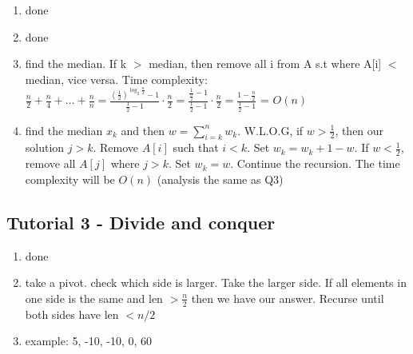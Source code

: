 \documentclass[../../main/main.tex]{subfiles}
\begin{document}
\begin{enumerate}
	\item done
	\item done
	\item
	      find the median. If k $>$ median, then remove all i from A s.t where A[i] $<$ median, vice versa.
	      Time complexity: $\frac{n}{2} + \frac{n}{4} + \ldots  + \frac{n}{n} = \frac{(\frac{1}{2})^{\log_2\frac{n}{2}} - 1}{\frac{1}{2}-1} \cdot \frac{n}{2} = \frac{\frac{1}{\frac{n}{2}} - 1}{\frac{1}{2}-1}\cdot \frac{n}{2} = \frac{1 - \frac{n}{2}}{\frac{1}{2}-1}$ = $O(n)$
	\item
	      find the median $x_k$ and then  $w = \sum^{n}_{i=k} w_k $. W.L.O.G, if  $w > \frac{1}{2}$, then our solution $j > k$. Remove $A[i]$ such that $i < k$. Set $w_k = w_k + 1- w$. If $w < \frac{1}{2}$, remove all $A[j]$ where  $j > k$. Set $w_k = w$. Continue the recursion.  The time complexity will be $O(n)$ (analysis the same as Q3)
\end{enumerate}

\subsection{Tutorial 3 - Divide and conquer}
\begin{enumerate}
	\item done
	\item take a pivot. check which side is larger. Take the larger side. If all elements in one side is the same and len $> \frac{n}{2}$ then we have our answer. Recurse until both sides have len $ < n/2 $
  \item 
    example: {5, -10, -10, 0, 60}
\end{enumerate}
\end{document}
